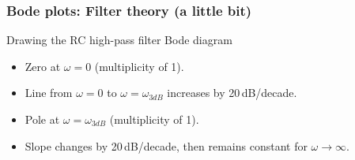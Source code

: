 \documentclass[beamer]{standalone}
\begin{document}
\begin{frame}
 \frametitle{Bode plots: Filter theory (a little bit)}
 \begin{block}{Drawing the RC high-pass filter Bode diagram}
  \begin{itemize}
   \item Zero at $\omega = 0$ (multiplicity of 1).
   \item Line from $\omega = 0$ to $\omega = \omega_{3dB}$ increases by 20\,dB/decade.
   \item Pole at $\omega = \omega_{3dB}$ (multiplicity of 1).
   \item Slope changes by 20\,dB/decade, then remains constant for $\omega \to \infty$.
  \end{itemize}
 \end{block}
\end{frame}
\end{document}
